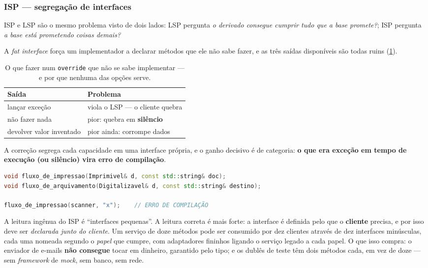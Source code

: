\subsubsection{ISP --- segregação de interfaces}

ISP e LSP são o mesmo problema visto de dois lados: LSP pergunta \emph{o derivado
consegue cumprir tudo que a base promete?}; ISP pergunta \emph{a base está
prometendo coisas demais?}

A \emph{fat interface} força um implementador a declarar métodos que ele não sabe
fazer, e as três saídas disponíveis são todas ruins
(\cref{tab:isp-saidas}).

\begin{table}[htbp]
\centering
\caption{O que fazer num \texttt{override} que não se sabe implementar --- e por
         que nenhuma das opções serve.}
\label{tab:isp-saidas}
\footnotesize
\begin{tabular}{@{}ll@{}}
\toprule
\textbf{Saída} & \textbf{Problema} \\
\midrule
lançar exceção          & viola o LSP --- o cliente quebra \\
não fazer nada          & pior: quebra em \textbf{silêncio} \\
devolver valor inventado& pior ainda: corrompe dados \\
\bottomrule
\end{tabular}
\end{table}

A correção segrega cada capacidade em uma interface própria, e o ganho decisivo
é de categoria: \textbf{o que era exceção em tempo de execução (ou silêncio)
vira erro de compilação}.

\begin{lstlisting}[style=bt, language=C++,
    caption={O cliente pede o mínimo de que precisa.}]
void fluxo_de_impressao(Imprimivel& d, const std::string& doc);
void fluxo_de_arquivamento(Digitalizavel& d, const std::string& destino);

fluxo_de_impressao(scanner, "x");    // ERRO DE COMPILAÇÃO
\end{lstlisting}

\begin{porque}
A leitura ingênua do ISP é ``interfaces pequenas''. A leitura correta é mais
forte: a interface é definida pelo que o \textbf{cliente} precisa, e por isso
deve ser \emph{declarada junto do cliente}. Um serviço de doze métodos pode ser
consumido por dez clientes através de dez interfaces minúsculas, cada uma
nomeada segundo o \emph{papel} que cumpre, com adaptadores fininhos ligando o
serviço legado a cada papel. O que isso compra: o enviador de e-mails
\textbf{não consegue} tocar em dinheiro, garantido pelo tipo; e os dublês de
teste têm dois métodos cada, em vez de doze --- sem \emph{framework} de
\emph{mock}, sem banco, sem rede.
\end{porque}

